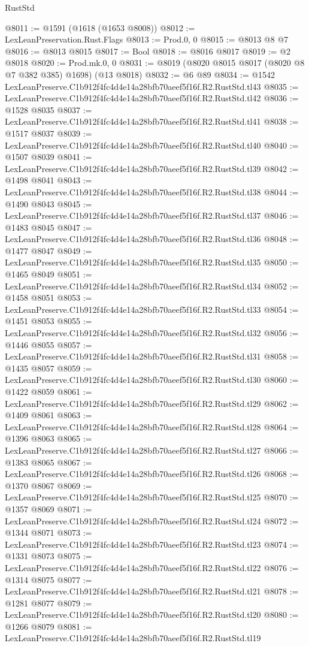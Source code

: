 \begin{lexlean}{RustStd}
\begin{coremodule}
@8011 := @1591 (@1618 (@1653 @8008))
@8012 := LexLeanPreservation.Rust.Flags
@8013 := Prod.{0, 0}
@8015 := @8013 @8 @7
@8016 := @8013 @8015
@8017 := Bool
@8018 := @8016 @8017
@8019 := @2 @8018
@8020 := Prod.mk.{0, 0}
@8031 := @8019 (@8020 @8015 @8017 (@8020 @8 @7 @382 @385) @1698) (@13 @8018)
@8032 := @6 @89
@8034 := @1542 LexLeanPreserve.C1b912f4fc4d4e14a28bfb70aeef5f16f.R2.RustStd.tl43
@8035 := LexLeanPreserve.C1b912f4fc4d4e14a28bfb70aeef5f16f.R2.RustStd.tl42
@8036 := @1528 @8035
@8037 := LexLeanPreserve.C1b912f4fc4d4e14a28bfb70aeef5f16f.R2.RustStd.tl41
@8038 := @1517 @8037
@8039 := LexLeanPreserve.C1b912f4fc4d4e14a28bfb70aeef5f16f.R2.RustStd.tl40
@8040 := @1507 @8039
@8041 := LexLeanPreserve.C1b912f4fc4d4e14a28bfb70aeef5f16f.R2.RustStd.tl39
@8042 := @1498 @8041
@8043 := LexLeanPreserve.C1b912f4fc4d4e14a28bfb70aeef5f16f.R2.RustStd.tl38
@8044 := @1490 @8043
@8045 := LexLeanPreserve.C1b912f4fc4d4e14a28bfb70aeef5f16f.R2.RustStd.tl37
@8046 := @1483 @8045
@8047 := LexLeanPreserve.C1b912f4fc4d4e14a28bfb70aeef5f16f.R2.RustStd.tl36
@8048 := @1477 @8047
@8049 := LexLeanPreserve.C1b912f4fc4d4e14a28bfb70aeef5f16f.R2.RustStd.tl35
@8050 := @1465 @8049
@8051 := LexLeanPreserve.C1b912f4fc4d4e14a28bfb70aeef5f16f.R2.RustStd.tl34
@8052 := @1458 @8051
@8053 := LexLeanPreserve.C1b912f4fc4d4e14a28bfb70aeef5f16f.R2.RustStd.tl33
@8054 := @1451 @8053
@8055 := LexLeanPreserve.C1b912f4fc4d4e14a28bfb70aeef5f16f.R2.RustStd.tl32
@8056 := @1446 @8055
@8057 := LexLeanPreserve.C1b912f4fc4d4e14a28bfb70aeef5f16f.R2.RustStd.tl31
@8058 := @1435 @8057
@8059 := LexLeanPreserve.C1b912f4fc4d4e14a28bfb70aeef5f16f.R2.RustStd.tl30
@8060 := @1422 @8059
@8061 := LexLeanPreserve.C1b912f4fc4d4e14a28bfb70aeef5f16f.R2.RustStd.tl29
@8062 := @1409 @8061
@8063 := LexLeanPreserve.C1b912f4fc4d4e14a28bfb70aeef5f16f.R2.RustStd.tl28
@8064 := @1396 @8063
@8065 := LexLeanPreserve.C1b912f4fc4d4e14a28bfb70aeef5f16f.R2.RustStd.tl27
@8066 := @1383 @8065
@8067 := LexLeanPreserve.C1b912f4fc4d4e14a28bfb70aeef5f16f.R2.RustStd.tl26
@8068 := @1370 @8067
@8069 := LexLeanPreserve.C1b912f4fc4d4e14a28bfb70aeef5f16f.R2.RustStd.tl25
@8070 := @1357 @8069
@8071 := LexLeanPreserve.C1b912f4fc4d4e14a28bfb70aeef5f16f.R2.RustStd.tl24
@8072 := @1344 @8071
@8073 := LexLeanPreserve.C1b912f4fc4d4e14a28bfb70aeef5f16f.R2.RustStd.tl23
@8074 := @1331 @8073
@8075 := LexLeanPreserve.C1b912f4fc4d4e14a28bfb70aeef5f16f.R2.RustStd.tl22
@8076 := @1314 @8075
@8077 := LexLeanPreserve.C1b912f4fc4d4e14a28bfb70aeef5f16f.R2.RustStd.tl21
@8078 := @1281 @8077
@8079 := LexLeanPreserve.C1b912f4fc4d4e14a28bfb70aeef5f16f.R2.RustStd.tl20
@8080 := @1266 @8079
@8081 := LexLeanPreserve.C1b912f4fc4d4e14a28bfb70aeef5f16f.R2.RustStd.tl19

\end{coremodule}
\end{lexlean}
